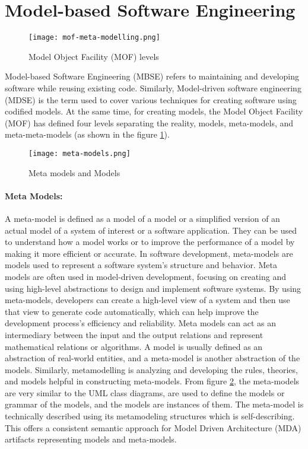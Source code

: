 \section{Model-based Software Engineering}
\label{background:section:mbse}
\begin{figure}[htbp!]
  \centering    
  \texttt{[image: mof-meta-modelling.png]}
  \caption[MOF levels]{Model Object Facility (MOF) levels}
  \label{fig:background:moflevels}
\end{figure}

Model-based Software Engineering (MBSE) refers to maintaining and developing software while reusing existing code.
Similarly, Model-driven software engineering (MDSE) is the term used to cover various techniques for creating software using codified models.
At the same time, for creating models, the Model Object Facility (MOF) has defined four levels separating the reality, models, meta-models, and meta-meta-models (as shown in the figure \ref{fig:background:moflevels}).
\begin{figure}[htbp!]
  \centering    
  \texttt{[image: meta-models.png]}
  \caption[Meta models]{Meta models and Models}
  \label{fig:background:m1m2}
\end{figure}

\paragraph{Meta Models:} 
A meta-model is defined as a model of a model or a simplified version of an actual model of a system of interest or a software application.
They can be used to understand how a model works or to improve the performance of a model by making it more efficient or accurate. 
In software development, meta-models are models used to represent a software system's structure and behavior.
Meta models are often used in model-driven development, focusing on creating and using high-level abstractions to design and implement software systems. By using meta-models, developers can create a high-level view of a system and then use that view to generate code automatically, which can help improve the development process's efficiency and reliability.
Meta models can act as an intermediary between the input and the output relations and represent mathematical relations or algorithms.
A model is usually defined as an abstraction of real-world entities, and a meta-model is another abstraction of the models. 
Similarly, metamodelling is analyzing and developing the rules, theories, and models helpful in constructing meta-models.
From figure \ref{fig:background:m1m2}, the meta-models are very similar to the UML class diagrams, are used to define the models or grammar of the models, and the models are instances of them. 
The meta-model is technically described using its metamodeling structures which is self-describing. 
This offers a consistent semantic approach for Model Driven Architecture (MDA) artifacts representing models and meta-models.

